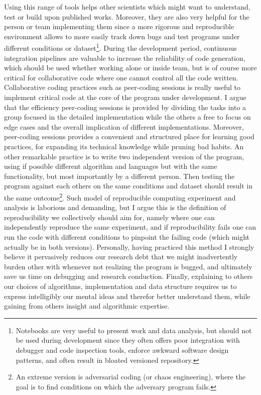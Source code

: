 Using this range of tools helps other scientists which might want to understand, test or build upon published works.
Moreover, they are also very helpful for the person or team implementing them since a more rigorous and reproducible environment allows to more easily track down bugs and test programs under different conditions or dataset\footnote{Notebooks are very useful to present work and data analysis, but should not be used during development since they often offers poor integration with debugger and code inspection tools, enforce awkward software design patterns, and often result in bloated versioned repository.}.
During the development period, continuous integration pipelines are valuable to increase the reliability of code generation, which should be used whether working alone or inside team, but is of course more critical for collaborative code where one cannot control all the code written.
Collaborative coding practices such as peer-coding sessions is really useful to implement critical code at the core of the program under development.
I argue that the efficiency peer-coding sessions is provided by dividing the tasks into a group focused in the detailed implementation while the others a free to focus on edge cases and the overall implication of different implementations.
Moreover, peer-coding sessions provides a convenient and structured place for learning good practices, for expanding its technical knowledge while pruning bad habits.
An other remarkable practice is to write two independent version of the program, using if possible different algorithm and languages but with the same functionality, but most importantly by a different person.
Then testing the program against each others on the same conditions and dataset should result in the same outcome\footnote{An extreme version is adversarial coding (or chaos engineering), where the goal is to find conditions on which the adversary program fails.}.
Such model of reproducible computing experiment and analysis is laborious and demanding, but I argue this is the definition of reproducibility we collectively should aim for, namely where one can independently reproduce the same experiment, and if reproducibility fails one can run the code with different conditions to pinpoint the failing code (which might actually be in both versions).
Personally, having practiced this method I strongly believe it pervasively reduces our research debt that we might inadvertently burden other with whenever not realizing the program is bugged, and ultimately save us time on debugging and research conduction.
Finally, explaining to others our choices of algorithms, implementation and data structure requires us to express intelligibly our mental ideas and therefor better understand them, while gaining from others insight and algorithmic expertise.

